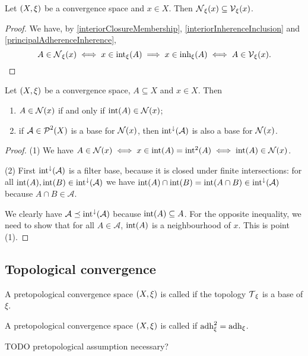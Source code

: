 \begin{lemma}
Let $\left( X,\xi \right)$ be a convergence space and $x\in X$. Then $\operatorname{\mathcal{N}}_\xi(x) \subseteq \operatorname{\mathcal{V}}_\xi(x)$.
\end{lemma}
\begin{proof}
We have, by \ref{interiorClosureMembership}, \ref{interiorInherenceInclusion} and \ref{principalAdherenceInherence},
\[ A \in \operatorname{\mathcal{N}}_\xi(x) \iff x\in \operatorname{int}_\xi(A) \implies x\in \operatorname{inh}_\xi(A) \iff A\in\operatorname{\mathcal{V}}_\xi(x). \]
\end{proof}

\begin{lemma} \label{interiorModificationNeighbourhoods}
Let $\left( X,\xi \right)$ be a convergence space, $A\subseteq X$ and $x\in X$. Then
\begin{enumerate}
\item $A\in\operatorname{\mathcal{N}}(x)$ \textup{if and only if} $\operatorname{int}(A)\in\operatorname{\mathcal{N}}(x)$;
\item if $\mathcal{A}\in\operatorname{\mathcal{P}}^2(X)$ is a base for $\operatorname{\mathcal{N}}(x)$, then $\operatorname{int}^{\downarrow}(\mathcal{A})$ is also a base for $\operatorname{\mathcal{N}}(x)$.
\end{enumerate}
\end{lemma}
\begin{proof}
(1) We have $A\in\operatorname{\mathcal{N}}(x) \iff x\in \operatorname{int}(A) = \operatorname{int}^2(A) \iff \operatorname{int}(A) \in \operatorname{\mathcal{N}}(x)$.

(2) First $\operatorname{int}^{\downarrow}(\mathcal{A})$ is a filter base, because it is closed under finite intersections: for all $\operatorname{int}(A),\operatorname{int}(B)\in \operatorname{int}^{\downarrow}(\mathcal{A})$ we have $\operatorname{int}(A)\cap\operatorname{int}(B) = \operatorname{int}(A\cap B) \in \operatorname{int}^{\downarrow}(\mathcal{A})$ because $A\cap B \in \mathcal{A}$.

We clearly have $\mathcal{A} \preceq \operatorname{int}^{\downarrow}(\mathcal{A})$ because $\operatorname{int}(A) \subseteq A$. For the opposite inequality, we need to show that for all $A\in \mathcal{A}$, $\operatorname{int}(A)$ is a neighbourhood of $x$. This is point (1).
\end{proof}





\subsection{Topological convergence}
\begin{definition}
A pretopological convergence space $\left( X,\xi \right)$ is called  if the topology $\operatorname{\mathcal{T}}_\xi$ is a base of $\xi$.
\end{definition}
\begin{definition}
A pretopological convergence space $\left( X,\xi \right)$ is called  if $\operatorname{adh}_\xi^2 = \operatorname{adh}_\xi$.
\end{definition}
TODO pretopological assumption necessary?

